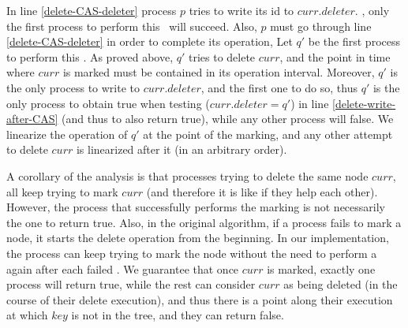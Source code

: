 {In line \ref{delete-CAS-deleter} process $p$ tries to write its id to $curr.deleter$. 
, only the first process to perform this \CAS\ will succeed. 
Also,  $p$ must go through line \ref{delete-CAS-deleter} in order to complete its operation, 
 Let $q'$ be the first process to perform this \CAS. 
As proved above, $q'$ tries to delete $curr$, and the point in time 
where $curr$ is marked must be contained in its operation interval. 
Moreover, $q'$ is the only process to write to $curr.deleter$, 
and the first one to do so, thus $q'$ is the only process to obtain true when testing 
($curr.deleter = q'$) in line \ref{delete-write-after-CAS} (and thus to also return true), 
while any other process will  false. We linearize the operation of $q'$ at the point 
of the marking, and any other attempt to delete $curr$ is linearized after it (in an arbitrary order).

A corollary of the analysis is that processes trying to delete the same node $curr$, 
all keep trying to mark $curr$ (and therefore it is like if they help each other). 
However, the process that successfully performs the marking 
is not necessarily the one to return true. Also, in the original algorithm, 
if a process fails to mark a node, it starts the delete operation from the beginning. 
In our implementation, the process can keep trying to mark the node without the need 
to perform a \y{\search\ } again after each failed \CAS. We guarantee that once $curr$ is marked, 
exactly one process will return true, while the rest can consider $curr$ as being deleted 
(in the course of their delete execution), and thus there is a point along their execution 
at which $key$ is not in the tree, and they can return false.




}



